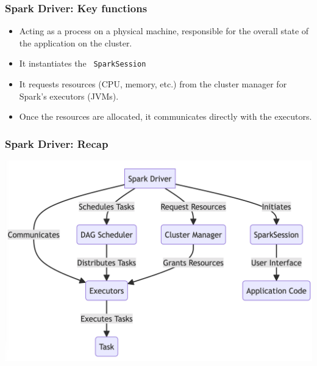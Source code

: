 \begin{frame}
    \frametitle{Spark Driver: Key functions}

    \begin{itemize}
        \item Acting as a process on a physical machine, responsible for the overall state of the application on the cluster.
        \item It instantiates the \texttt{\color{blue} SparkSession}
        \item It requests resources  (CPU, memory, etc.) from the cluster manager for Spark’s executors (JVMs).
        \item Once the resources are allocated, it communicates directly with the executors.
    \end{itemize}

\end{frame}


\begin{frame}
    \frametitle{Spark Driver: Recap}
%
    \includegraphics[width=\textwidth,height=.85\textheight,keepaspectratio]{./Figures/chapter-04/Mairmaid_SparkDriver}

\end{frame}


